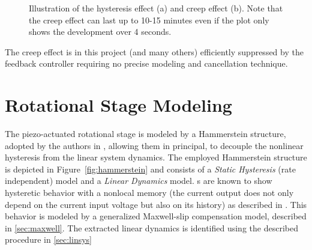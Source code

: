 \begin{figure}[h!]
  \centering %
  \qquad
  \caption{\label{fig:effects} Illustration of the hysteresis effect (a) and creep effect (b). Note that the creep effect can last up to 10-15 minutes even if the plot only shows the development over 4 seconds.}
\end{figure}

The creep effect is in this project (and many others) efficiently suppressed by the feedback controller requiring no precise modeling and cancellation technique.

\section{Rotational Stage Modeling}
The piezo-actuated rotational stage is modeled by a Hammerstein structure, adopted by the authors in \cite{ButcherController:2015}, allowing them in principal, to decouple the nonlinear hysteresis from the linear system dynamics. The employed Hammerstein structure is depicted in Figure~\ref{fig:hammerstein} and consists of a \emph{Static Hysteresis} (rate independent) model and a \emph{Linear Dynamics} model. {\abbrPEA}s are known to show hysteretic behavior with a nonlocal memory (the current output does not only depend on the current input voltage but also on its history) as described in \cite{ButcherIdentification:2015}. This behavior is modeled by a generalized Maxwell-slip compensation model, described in \ref{sec:maxwell}. The extracted linear dynamics is identified using the described procedure in \ref{sec:linsys}

